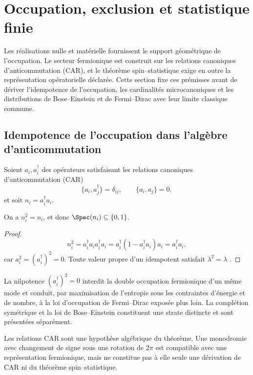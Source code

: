 \section{Occupation, exclusion et statistique finie}
\label{chap:ocupacion-estadistica}

Les réalisations nulle et matérielle fournissent le support géométrique de l’occupation. Le secteur fermionique est construit sur les relations canoniques d’anticommutation (CAR), et le théorème spin--statistique exige en outre la représentation opératorielle déclarée. Cette section fixe ces prémisses avant de dériver l’idempotence de l’occupation, les cardinalités microcanoniques et les distributions de Bose--Einstein et de Fermi--Dirac avec leur limite classique commune.

\subsection{Idempotence de l’occupation dans l’algèbre d’anticommutation}

Soient \(a_i,a_i^\dagger\) des opérateurs satisfaisant les relations canoniques d’anticommutation (CAR)
\[
 \{a_i,a_j^\dagger\}=\delta_{ij},
 \qquad \{a_i,a_j\}=0,
\]
et soit \(n_i=a_i^\dagger a_i\).

\begin{theorem}
\label{thm:principio-exclusion-pauli}
On a \(n_i^2=n_i\), et donc \(\Spec(n_i)\subseteq\{0,1\}\).
\end{theorem}
\begin{proof}
\[
 n_i^2=a_i^\dagger a_i a_i^\dagger a_i
 =a_i^\dagger(1-a_i^\dagger a_i)a_i
 =a_i^\dagger a_i,
\]
car \(a_i^2=(a_i^\dagger)^2=0\). Toute valeur propre d’un idempotent satisfait \(\lambda^2=\lambda\) \cite{Pauli1925,Dirac1926}.
\end{proof}

La nilpotence \((a_i^\dagger)^2=0\) interdit la double occupation fermionique d’un même mode et conduit, par maximisation de l’entropie sous les contraintes d’énergie et de nombre, à la loi d’occupation de Fermi--Dirac exposée plus loin. La complétion symétrique et la loi de Bose--Einstein constituent une strate distincte et sont présentées séparément.

Les relations CAR sont une hypothèse algébrique du théorème. Une monodromie avec changement de signe sous une rotation de \(2\pi\) est compatible avec une représentation fermionique, mais ne constitue pas à elle seule une dérivation de CAR ni du théorème spin--statistique.
